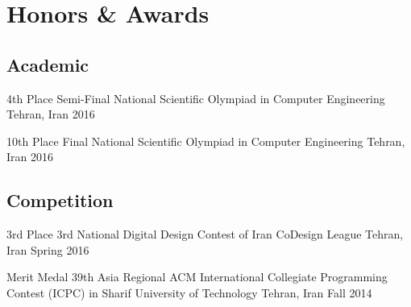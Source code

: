 \section{Honors \& Awards}

\subsection{Academic}

\cventry%
  {4th Place}
  {Semi-Final National Scientific Olympiad in Computer Engineering}
  {Tehran, Iran}{}
  {2016}{}

\cventry%
  {10th Place}
  {Final National Scientific Olympiad in Computer Engineering}
  {Tehran, Iran}{}
  {2016}{}

\subsection{Competition}

\cventry%
  {3rd Place}
  {3rd National Digital Design Contest of Iran CoDesign League}
  {Tehran, Iran}{}
  {Spring 2016}{}

\cventry%
  {Merit Medal}
  {39th Asia Regional ACM International Collegiate Programming Contest (ICPC) in Sharif University of Technology}
  {Tehran, Iran}{}
  {Fall 2014}{}
